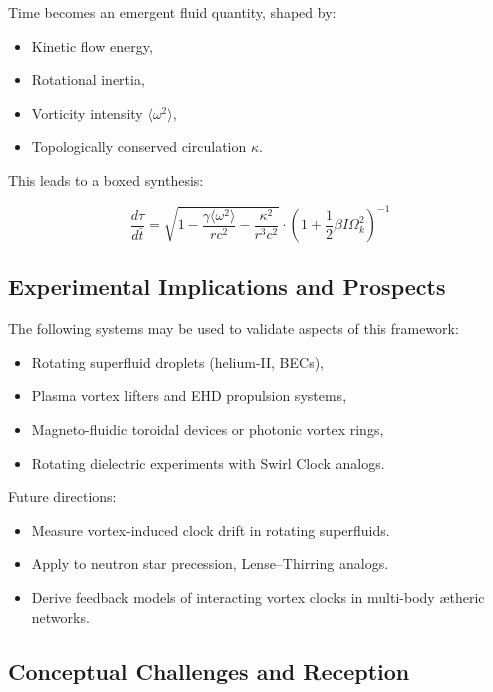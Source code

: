 \documentclass[preprint]{revtex4-2}
\begin{document}
Time becomes an emergent fluid quantity, shaped by:
\begin{itemize}
    \item Kinetic flow energy,
    \item Rotational inertia,
    \item Vorticity intensity \( \langle \omega^2 \rangle \),
    \item Topologically conserved circulation \( \kappa \).
\end{itemize}

This leads to a boxed synthesis:

\begin{equation}
\boxed{
\frac{d\tau}{d\bar{t}} =
\sqrt{1 - \frac{\gamma \langle \omega^2 \rangle}{r c^2} - \frac{\kappa^2}{r^3 c^2}} \cdot
\left(1 + \frac{1}{2} \beta I \Omega_k^2 \right)^{-1}
}
\label{eq:VAM_final_time_dilation}
\end{equation}

\subsection{Experimental Implications and Prospects}

The following systems may be used to validate aspects of this framework:
\begin{itemize}
    \item Rotating superfluid droplets (helium-II, BECs),
    \item Plasma vortex lifters and EHD propulsion systems,
    \item Magneto-fluidic toroidal devices or photonic vortex rings,
    \item Rotating dielectric experiments with Swirl Clock analogs.
\end{itemize}

Future directions:
\begin{itemize}
    \item Measure vortex-induced clock drift in rotating superfluids.
    \item Apply to neutron star precession, Lense–Thirring analogs.
    \item Derive feedback models of interacting vortex clocks in multi-body ætheric networks.
\end{itemize}

\subsection{Conceptual Challenges and Reception}
\end{document}
